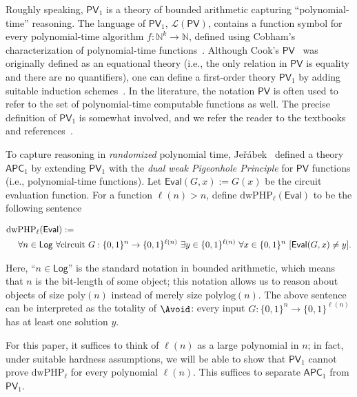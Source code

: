 \documentclass[10pt,a4paper]{article}
\theoremstyle{definition}
\theoremstyle{remark}
\renewcommand{\poly}{\mathrm{poly}}
\renewcommand{\polylog}{\mathrm{polylog}}
\newcommand{\dwPHP}{\mathrm{dwPHP}}
\newcommand{\PV}{\mathsf{PV}}
\newcommand{\APC}{\mathsf{APC}}
\newcommand{\calL}{\mathcal{L}}
\newcommand{\N}{\mathbb{N}}
\newcommand{\Eval}{\mathsf{Eval}}%
\newcommand{\Jerabek}{Je\v{r}\'{a}bek\xspace}
\begin{document}
Roughly speaking, $\PV_1$ is a theory of bounded arithmetic capturing ``polynomial-time'' reasoning. The language of $\PV_1$, $\calL(\PV)$, contains a function symbol for every polynomial-time algorithm $f: \N^k \to \N$, defined using Cobham's characterization of polynomial-time functions~\cite{cobham1964intrinsic}. Although Cook's $\PV$~\cite{Cook75} was originally defined as an equational theory (i.e., the only relation in $\PV$ is equality and there are no quantifiers), one can define a first-order theory $\PV_1$ by adding suitable induction schemes~\cite{Cook75, KRAJICEK1991143}. In the literature, the notation $\PV$ is often used to refer to the set of polynomial-time computable functions as well. The precise definition of $\PV_1$ is somewhat involved, and we refer the reader to the textbooks~\cite{Krajicek-book,Cook-Nguyen,Krajicek_proof_complexity} and references~\cite{Cook75,Jerabek06, ChenLiOliveira24, Li25}.

To capture reasoning in \emph{randomized} polynomial time, \Jerabek~\cite{Jerabek04,Jerabek-phd,Jerabek07} defined a theory $\APC_1$ by extending $\PV_1$ with the \emph{dual weak Pigeonhole Principle} for $\PV$ functions (i.e., polynomial-time functions). Let $\Eval(G,x):=G(x)$ be the circuit evaluation function. For a function $\ell(n) > n$, define $\dwPHP_\ell(\Eval)$ to be the following sentence

\begin{align*}
    &\dwPHP_\ell(\Eval):=\nonumber\nopagebreak\\
    &~~~~\forall n\in \mathsf{Log}~\forall\text{circuit }G:\{0,1\}^n\to \{0,1\}^{\ell(n)}~\exists y\in \{0,1\}^{\ell(n)}~\forall x\in \{0,1\}^n~[\Eval(G,x)\neq y]. 
\end{align*}

Here, ``$n\in\mathsf{Log}$'' is the standard notation in bounded arithmetic, which means that $n$ is the bit-length of some object; this notation allows us to reason about objects of size $\poly(n)$ instead of merely size $\polylog(n)$. The above sentence can be interpreted as the totality of $\Avoid$: every input $G: \{0, 1\}^n \to \{0, 1\}^{\ell(n)}$ has at least one solution $y$.

For this paper, it suffices to think of $\ell(n)$ as a large polynomial in $n$; in fact, under suitable hardness assumptions, we will be able to show that $\PV_1$ cannot prove $\dwPHP_\ell$ for every polynomial $\ell(n)$. This suffices to separate $\APC_1$ from $\PV_1$.
\end{document}
